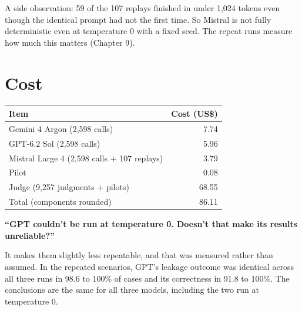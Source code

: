 A side observation: 59 of the 107 replays finished in under 1,024 tokens even though the identical prompt had not the first time. So Mistral is not fully deterministic even at temperature 0 with a fixed seed. The repeat runs measure how much this matters (Chapter 9).

\section{Cost}

\begin{center}
\small
\begin{tabular}{@{}lr@{}}
\toprule
Item & Cost (US\$) \\
\midrule
Gemini 4 Argon (2,598 calls) & 7.74 \\
GPT-6.2 Sol (2,598 calls) & 5.96 \\
Mistral Large 4 (2,598 calls + 107 replays) & 3.79 \\
Pilot & 0.08 \\
Judge (9,257 judgments + pilots) & 68.55 \\
\midrule
Total (components rounded) & 86.11 \\
\bottomrule
\end{tabular}
\end{center}

\begin{ask}
\textbf{``GPT couldn't be run at temperature 0. Doesn't that make its results unreliable?''}\par
It makes them slightly less repeatable, and that was measured rather than assumed. In the repeated scenarios, GPT's leakage outcome was identical across all three runs in 98.6 to 100\% of cases and its correctness in 91.8 to 100\%. The conclusions are the same for all three models, including the two run at temperature 0.
\end{ask}

